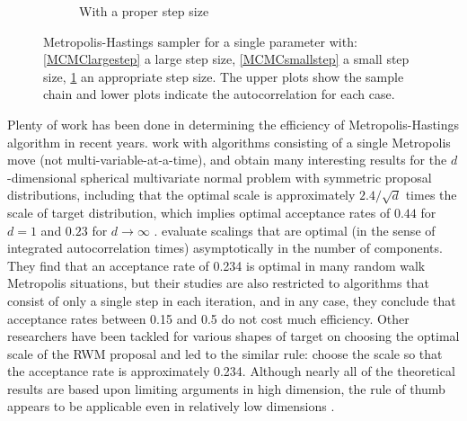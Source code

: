 \begin{figure}[h]
\begin{subfigure}[b]{0.32\textwidth}
    \caption{With a proper step size}\label{MCMCproperstep}
\end{subfigure}
\caption{Metropolis-Hastings sampler for a single parameter with: \ref{MCMClargestep} a large step size, \ref{MCMCsmallstep} a small step size, \ref{MCMCproperstep} an appropriate step size. The upper plots show the sample chain and lower plots indicate the autocorrelation for each case.}
\label{largesmallstepsize}
\end{figure}


Plenty of work has been done in determining the efficiency of Metropolis-Hastings algorithm in recent years. \cite{gelman1996efficient} work with algorithms consisting of a single Metropolis move (not multi-variable-at-a-time), and obtain many interesting results for the $d$-dimensional spherical multivariate normal problem with symmetric proposal distributions, including that the optimal scale is approximately $2.4/\sqrt{d}$ times the scale of target distribution, which implies optimal acceptance rates of $0.44$ for $d = 1$ and $0.23$ for $d\rightarrow \infty$ \citep{gilks1995markov}. \cite{roberts2001optimal} evaluate scalings that are optimal (in the sense of integrated autocorrelation times) asymptotically in the number of components. They find that an acceptance rate of 0.234 is optimal in many random walk Metropolis situations, but their studies are also restricted to algorithms that consist of only a single step in each iteration, and in any case, they conclude that acceptance rates between 0.15 and 0.5 do not cost much efficiency. Other researchers \citep{roberts1997weak, bedard2007weak, beskos2009optimal, sherlock2009optimal, sherlock2013optimal} have been tackled for various shapes of target on choosing the optimal scale of the RWM proposal and led to the similar rule: choose the scale so that the acceptance rate is approximately 0.234. Although nearly all of the theoretical results are based upon limiting arguments in high dimension, the rule of thumb appears to be applicable even in relatively low dimensions \citep{sherlock2010random}. 



